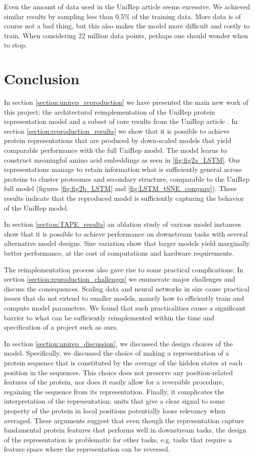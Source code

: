 \documentclass[a4paper,12pt]{article}
\begin{document}
Even the amount of data used in the UniRep article seems excessive. We achieved similar results by sampling less than 0.5\% of the training data. More data is of course not a bad thing, but this also makes the model more difficult and costly to train. When considering 22 million data points, perhaps one should wonder when to stop.

\clearpage
\section{Conclusion}
In section \ref{section:unirep_reproduction} we have presented the main new work of this project: the architectural reimplementation of the UniRep protein representation model and a subset of core results from the UniRep article \cite{alley2019unified}. In section \ref{section:reproduction_results} we show that it is possible to achieve protein representations that are produced by down-scaled models that yield comparable performance with the full UniRep model. The model learns to construct meaningful amino acid embeddings as seen in \ref{fig:fig2a_LSTM}. Our representations manage to retain information what is sufficiently general across proteins to cluster proteomes and secondary structure, comparable to the UniRep full model (figures \ref{fig:fig2b_LSTM} and \ref{fig:LSTM_tSNE_compare}). These results indicate that the reproduced model is sufficiently capturing the behavior of the UniRep model. 

In section \ref{section:TAPE_results} an ablation study of various model instances show that it is possible to achieve performance on downstream tasks with several alternative model designs. Size variation show that larger models yield marginally better performance, at the cost of computations and hardware requirements.

The reimplementation process also gave rise to some practical complications: In section \ref{section:reproduction_challenges} we enumerate major challenges and discuss the consequences. Scaling data and neural networks in size cause practical issues that do not extend to smaller models, namely how to efficiently train and compute model parameters. We found that such practicalities cause a significant barrier to what can be sufficiently reimplemented within the time and specification of a project such as ours.

In section \ref{section:unirep_discussion}, we discussed the design choices of the model. Specifically, we discussed the choice of making a representation of a protein sequence that is constituted by the average of the hidden states at each position in the sequences. This choice does not preserve any position-related features of the protein, nor does it easily allow for a reversible procedure, regaining the sequence from its representation. Finally, it complicates the interpretation of the representation: units that give a clear signal to some property of the protein in local positions potentially loose relevancy when averaged. These arguments suggest that even though the representation capture fundamental protein features that performs well in downstream tasks, the design of the representation is problematic for other tasks, e.g. tasks that require a feature space where the representation can be reversed.
\end{document}
